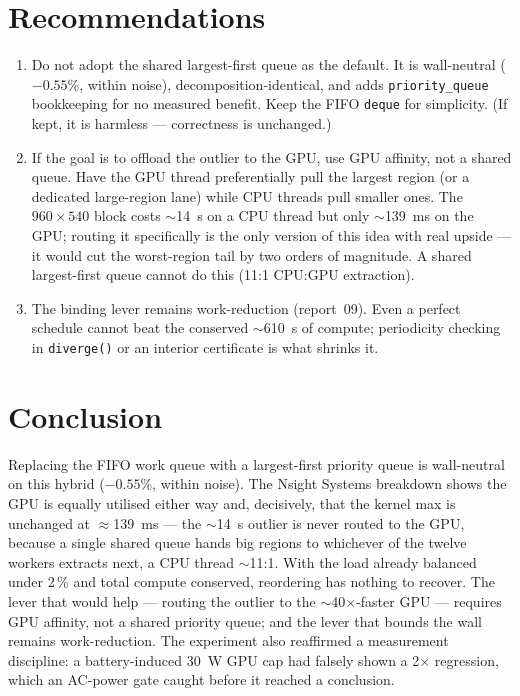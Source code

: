 \documentclass[
	english,
	letterpaper, oneside
]{article}
\begin{document}
\section{Recommendations}

\begin{enumerate}
    \item Do not adopt the shared largest-first queue as the default.
    It is wall-neutral ($-0.55\%$, within noise), decomposition-identical, and
    adds \texttt{priority\_queue} bookkeeping for no measured benefit. Keep the
    FIFO \texttt{deque} for simplicity. (If kept, it is harmless --- correctness
    is unchanged.)

    \item If the goal is to offload the outlier to the GPU, use GPU
    affinity, not a shared queue. Have the GPU thread preferentially pull the
    largest region (or a dedicated large-region lane) while CPU threads pull
    smaller ones. The $960\times540$ block costs $\sim$14~s on a CPU thread but
    only $\sim$139~ms on the GPU; routing it specifically is the only
    version of this idea with real upside --- it would cut the worst-region tail
    by two orders of magnitude. A shared largest-first queue cannot do this
    (11:1 CPU:GPU extraction).

    \item The binding lever remains work-reduction (report~09). Even a
    perfect schedule cannot beat the conserved $\sim$610~s of compute; periodicity
    checking in \texttt{diverge()} or an interior certificate is what shrinks it.
\end{enumerate}

\section{Conclusion}

Replacing the FIFO work queue with a largest-first priority queue is
wall-neutral on this hybrid ($-0.55\%$, within noise). The Nsight Systems
breakdown shows the GPU is equally utilised either way and, decisively, that the
kernel max is unchanged at $\approx$139~ms --- the $\sim$14~s outlier is never
routed to the GPU, because a single shared queue hands big regions to whichever
of the twelve workers extracts next, a CPU thread $\sim$11:1. With the load
already balanced under 2\,\% and total compute conserved, reordering has nothing
to recover. The lever that would help --- routing the outlier to the
$\sim$40$\times$-faster GPU --- requires GPU affinity, not a shared
priority queue; and the lever that bounds the wall remains work-reduction. The
experiment also reaffirmed a measurement discipline: a battery-induced 30~W GPU
cap had falsely shown a 2$\times$ regression, which an AC-power gate caught
before it reached a conclusion.
\end{document}
